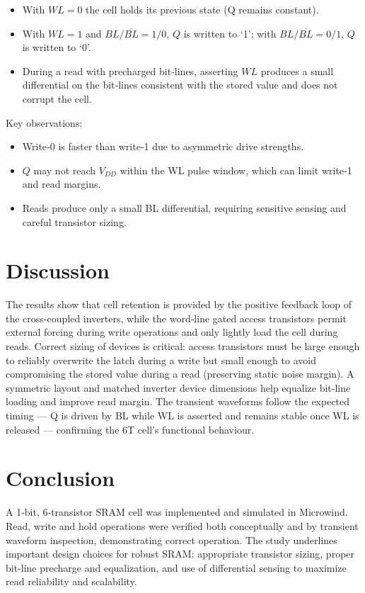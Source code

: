 \documentclass[12pt]{article}
\begin{document}
\begin{itemize}
  \item With \(WL=0\) the cell holds its previous state (Q remains constant).
  \item With \(WL=1\) and \(BL/\overline{BL}=1/0\), \(Q\) is written to ‘1’; with \(BL/\overline{BL}=0/1\), \(Q\) is written to ‘0’.
  \item During a read with precharged bit‑lines, asserting \(WL\) produces a small differential on the bit‑lines consistent with the stored value and does not corrupt the cell.
\end{itemize}

Key observations:
\begin{itemize}
  \item Write‑0 is faster than write‑1 due to asymmetric drive strengths.
  \item \(Q\) may not reach \(V_{DD}\) within the WL pulse window, which can limit write‑1 and read margins.
  \item Reads produce only a small BL differential, requiring sensitive sensing and careful transistor sizing.
\end{itemize}

\section*{Discussion}
The results show that cell retention is provided by the positive feedback loop of the cross‑coupled inverters, while the word‑line gated access transistors permit external forcing during write operations and only lightly load the cell during reads. Correct sizing of devices is critical: access transistors must be large enough to reliably overwrite the latch during a write but small enough to avoid compromising the stored value during a read (preserving static noise margin). A symmetric layout and matched inverter device dimensions help equalize bit‑line loading and improve read margin. The transient waveforms follow the expected timing — Q is driven by BL while WL is asserted and remains stable once WL is released — confirming the 6T cell’s functional behaviour.

\section*{Conclusion}
A 1‑bit, 6‑transistor SRAM cell was implemented and simulated in Microwind. Read, write and hold operations were verified both conceptually and by transient waveform inspection, demonstrating correct operation. The study underlines important design choices for robust SRAM: appropriate transistor sizing, proper bit‑line precharge and equalization, and use of differential sensing to maximize read reliability and scalability.



\renewcommand{\bibname}{References}

\end{document}
